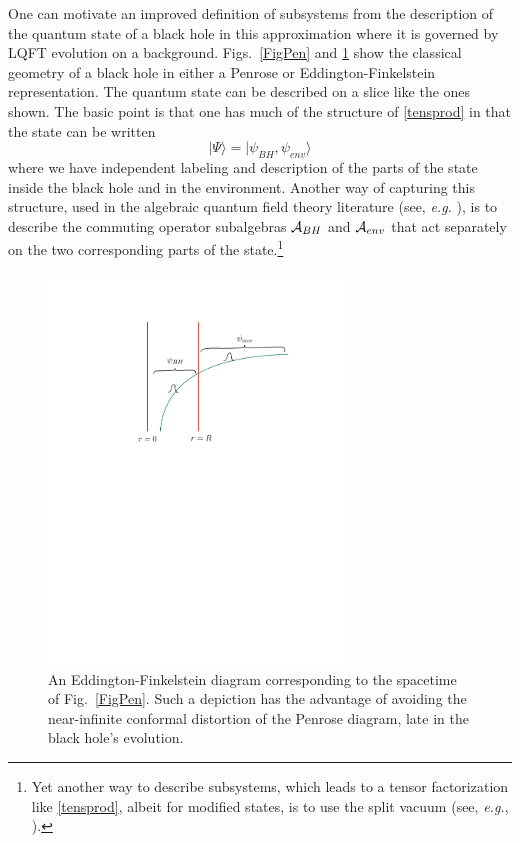 \documentclass[12pt]{article}
\numberwithin{equation}{section}
\newcommand{\cala}{{\cal A}}
\newcommand{\beq}{\begin{equation}}
\newcommand{\eeq}{\end{equation}}
\begin{document}
One can motivate an improved definition of subsystems from the description of the quantum state of a black hole in this approximation where it is governed by LQFT evolution on a background.  Figs.~\ref{FigPen} and \ref{FigEF} show the classical geometry of a black hole in either a Penrose or Eddington-Finkelstein representation.  The quantum state can be described on a slice like the ones shown.  The basic point is that one has much of the structure of \eqref{tensprod} in that the state can be written
\beq\label{psitot}
|\Psi\rangle = |\psi_{BH},\psi_{env}\rangle
\eeq
where we have independent labeling and description of the parts of the state inside the black hole and in the environment.  Another way of capturing this structure, used in the algebraic quantum field theory literature (see, {\it e.g.} \cite{Haag}), is to describe the commuting operator subalgebras $\cala_{BH}$ and $\cala_{env}$ that act separately on the two corresponding parts of the state.\footnote{Yet another way to describe subsystems, which leads to a tensor factorization like \eqref{tensprod}, albeit for modified states, is to use the split vacuum (see, {\it e.g.}, \cite{Haag}).}


\begin{figure}[!hbtp] \begin{center}
\includegraphics[width=8cm]{Fig-EFS.pdf}
\end{center}
\caption{An Eddington-Finkelstein diagram corresponding to the spacetime of Fig.~\ref{FigPen}.  Such a depiction has the advantage of avoiding the near-infinite conformal distortion of the Penrose diagram, late in the black hole's evolution.}
\label{FigEF}
\end{figure} 
\end{document}
